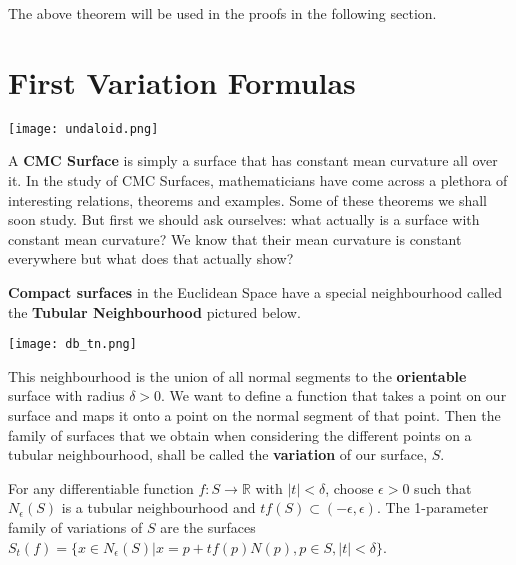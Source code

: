 \documentclass[a4paper,12pt]{report}
\begin{document}
The above theorem will be used in the proofs in the following section.

\section{First Variation Formulas}

\begin{center}\texttt{[image: undaloid.png]}
\end{center}

A \textbf{CMC Surface} is simply a surface that has constant mean curvature all over it.\newline
\hspace{-0.66cm}In the study of CMC Surfaces, mathematicians have come across a plethora of interesting relations, theorems and examples. Some of these theorems we shall soon study. But first we should ask ourselves: what actually is a surface with constant mean curvature? We know that their mean curvature is constant everywhere but what does that actually show?\newline

\hspace{-0.75cm} \textbf{Compact surfaces} in the Euclidean Space have a special neighbourhood called the \textbf{Tubular Neighbourhood} pictured below.\newline

\begin{center}\texttt{[image: db\_tn.png]}
\end{center}

\hspace{-0.66cm}This neighbourhood is the union of all normal segments to the \textbf{orientable} surface with radius $\delta > 0$.\newline
We want to define a function that takes a point on our surface and maps it onto a point on the normal segment of that point. Then the family of surfaces that we obtain when considering the different points on a tubular neighbourhood, shall be called the \textbf{variation} of our surface, $S$.

\begin{definition}
For any differentiable function $f:S \rightarrow \mathbb{R}$ with $|t| < \delta$, choose $\epsilon > 0$ such that $N_{\epsilon}(S)$ is a tubular neighbourhood and $tf(S) \subset (-\epsilon, \epsilon)$. The 1-parameter family of variations of $S$ are the surfaces $S_{t}(f) = \{ x \in N_{\epsilon}(S) | x = p + tf(p)N(p), p \in S, |t| < \delta \}$.
\end{definition}
\end{document}
